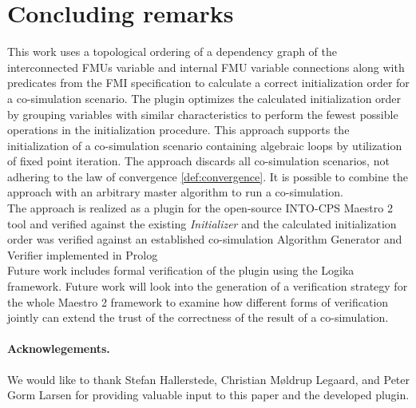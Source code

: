 \section{Concluding remarks}\label{sc:summary}
This work uses a topological ordering of a dependency graph of the interconnected FMUs variable and internal FMU variable connections along with predicates from the FMI specification to calculate a correct initialization order for a co-simulation scenario. The plugin optimizes the calculated initialization order by grouping variables with similar characteristics to perform the fewest possible operations in the initialization procedure.
This approach supports the initialization of a co-simulation scenario containing algebraic loops by utilization of fixed point iteration. The approach discards all co-simulation scenarios, not adhering to the law of convergence \ref{def:convergence}.
It is possible to combine the approach with an arbitrary master algorithm to run a co-simulation. \\
The approach is realized as a plugin for the open-source INTO-CPS Maestro 2 tool and verified against the existing \textit{Initializer} and the calculated initialization order was verified against an established co-simulation Algorithm Generator and Verifier implemented in Prolog\cite{gomes_lucio_vangheluwe_2019}\\
Future work includes formal verification of the plugin using the Logika framework\cite{inbook}.
Future work will look into the generation of a verification strategy for the whole Maestro 2 framework to examine how different forms of verification jointly can extend the trust of the correctness of the result of a co-simulation. 

\paragraph*{\textbf{Acknowlegements.}}We would like to thank Stefan Hallerstede, Christian Møldrup Legaard, and Peter Gorm Larsen for providing valuable input to this paper and the developed plugin.